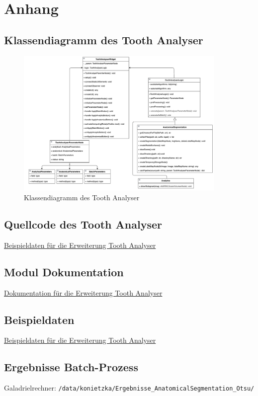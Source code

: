 \chapter{Anhang}
\label{chap:anhang}

\section{Klassendiagramm des Tooth Analyser}
\begin{figure}[h]
	\centering
	\includegraphics[width=0.9\textwidth, angle=90]{img/toothAnalyserClasses.png}
	\caption{Klassendiagramm des Tooth Analyser}
	\label{fig:klassendiagramm_gesamt}
\end{figure}

\section{Quellcode des Tooth Analyser}
\href{https://github.com/lukaskonietzka/SlicerToothAnalyser/blob/main/ToothAnalyser/ToothAnalyser.py}{Beispieldaten
für die Erweiterung Tooth Analyser}

\section{Modul Dokumentation}
\href{https://github.com/lukaskonietzka/SlicerToothAnalyser/tree/main}{Dokumentation
für die Erweiterung Tooth Analyser}

\section{Beispieldaten}
\href{https://github.com/lukaskonietzka/ToothAnalyserSampleData}{Beispieldaten
für die Erweiterung Tooth Analyser}

\section{Ergebnisse Batch-Prozess}
Galadrielrechner: \texttt{/data/konietzka/Ergebnisse\_AnatomicalSegmentation\_Otsu/}
